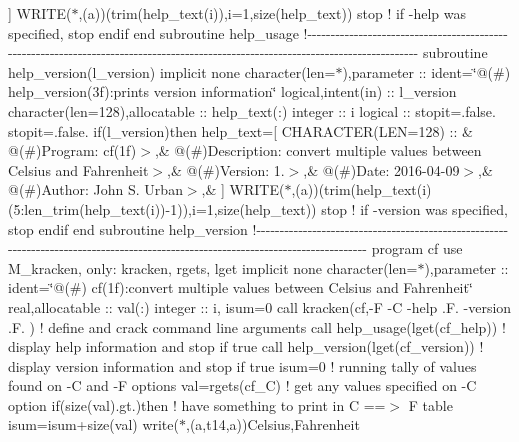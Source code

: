 \begin{DoxyCompactItemize}
\textquotesingle{}\textquotesingle{}\mbox{]} W\+R\+I\+T\+E($\ast$,\textquotesingle{}(a)\textquotesingle{})(trim(help\+\_\+text(i)),i=1,size(help\+\_\+text)) stop ! if -\/help was specified, stop endif end subroutine help\+\_\+usage !-\/-\/-\/-\/-\/-\/-\/-\/-\/-\/-\/-\/-\/-\/-\/-\/-\/-\/-\/-\/-\/-\/-\/-\/-\/-\/-\/-\/-\/-\/-\/-\/-\/-\/-\/-\/-\/-\/-\/-\/-\/-\/-\/-\/-\/-\/-\/-\/-\/-\/-\/-\/-\/-\/-\/-\/-\/-\/-\/-\/-\/-\/-\/-\/-\/-\/-\/-\/-\/-\/-\/-\/-\/-\/-\/-\/-\/-\/-\/-\/-\/-\/-\/-\/-\/-\/-\/-\/-\/-\/-\/-\/-\/-\/-\/-\/-\/-\/-\/-\/-\/-\/-\/-\/-\/-\/-\/-\/-\/-\/-\/-\/-\/-\/-\/-\/-\/-\/-\/-\/-\/-\/-\/-\/-\/-\/-\/-\/-\/-\/-\/ subroutine help\+\_\+version(l\+\_\+version) implicit none character(len=$\ast$),parameter \+:: ident=\char`\"{}@(\#) help\+\_\+version(3f)\+:prints version information\char`\"{} logical,intent(in) \+:: l\+\_\+version character(len=128),allocatable \+:: help\+\_\+text(\+:) integer \+:: i logical \+:: stopit=.\+false. stopit=.\+false. if(l\+\_\+version)then help\+\_\+text=\mbox{[} C\+H\+A\+R\+A\+C\+T\+E\+R(\+L\+E\+N=128) \+:: \& \textquotesingle{}@(\#)\+Program\+: cf(1f)$>$\textquotesingle{},\& \textquotesingle{}@(\#)\+Description\+: convert multiple values between Celsius and Fahrenheit$>$\textquotesingle{},\& \textquotesingle{}@(\#)\+Version\+: 1.$>$\textquotesingle{},\& \textquotesingle{}@(\#)\+Date\+: 2016-\/04-\/09$>$\textquotesingle{},\& \textquotesingle{}@(\#)\+Author\+: John S. Urban$>$\textquotesingle{},\& \textquotesingle{}\textquotesingle{}\mbox{]} W\+R\+I\+T\+E($\ast$,\textquotesingle{}(a)\textquotesingle{})(trim(help\+\_\+text(i)(5\+:len\+\_\+trim(help\+\_\+text(i))-\/1)),i=1,size(help\+\_\+text)) stop ! if -\/version was specified, stop endif end subroutine help\+\_\+version !-\/-\/-\/-\/-\/-\/-\/-\/-\/-\/-\/-\/-\/-\/-\/-\/-\/-\/-\/-\/-\/-\/-\/-\/-\/-\/-\/-\/-\/-\/-\/-\/-\/-\/-\/-\/-\/-\/-\/-\/-\/-\/-\/-\/-\/-\/-\/-\/-\/-\/-\/-\/-\/-\/-\/-\/-\/-\/-\/-\/-\/-\/-\/-\/-\/-\/-\/-\/-\/-\/-\/-\/-\/-\/-\/-\/-\/-\/-\/-\/-\/-\/-\/-\/-\/-\/-\/-\/-\/-\/-\/-\/-\/-\/-\/-\/-\/-\/-\/-\/-\/-\/-\/-\/-\/-\/-\/-\/-\/-\/-\/-\/-\/-\/-\/-\/-\/-\/-\/-\/-\/-\/-\/-\/-\/-\/-\/-\/-\/-\/-\/ program cf use M\+\_\+kracken, only\+: kracken, rgets, lget implicit none character(len=$\ast$),parameter \+:: ident=\char`\"{}@(\#) cf(1f)\+:convert multiple values between Celsius and Fahrenheit\char`\"{} real,allocatable \+:: val(\+:) integer \+:: i, isum=0 call kracken(\textquotesingle{}cf\textquotesingle{},\textquotesingle{}-\/\+F -\/\+C -\/help .\+F. -\/version .\+F.\textquotesingle{} ) ! define and crack command line arguments call help\+\_\+usage(lget(\textquotesingle{}cf\+\_\+help\textquotesingle{})) ! display help information and stop if true call help\+\_\+version(lget(\textquotesingle{}cf\+\_\+version\textquotesingle{})) ! display version information and stop if true isum=0 ! running tally of values found on -\/\+C and -\/\+F options val=rgets(\textquotesingle{}cf\+\_\+\+C\textquotesingle{}) ! get any values specified on -\/\+C option if(size(val).\+gt.)then ! have something to print in C ==$>$ F table isum=isum+size(val) write($\ast$,\textquotesingle{}(a,t14,a)\textquotesingle{})\textquotesingle{}\+Celsius\textquotesingle{},\textquotesingle{}\+Fahrenheit\textquotesingle{} 
\end{DoxyCompactItemize}
